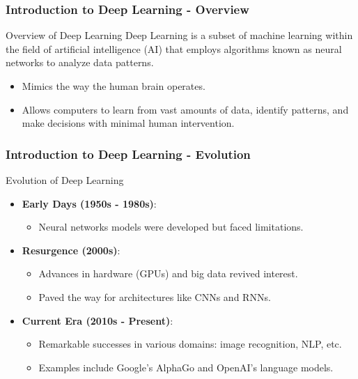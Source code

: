\documentclass[aspectratio=169]{beamer}
\begin{document}
\frame{\titlepage}

\begin{frame}[fragile]
    \frametitle{Introduction to Deep Learning - Overview}
    \begin{block}{Overview of Deep Learning}
        Deep Learning is a subset of machine learning within the field of artificial intelligence (AI) that employs algorithms known as neural networks to analyze data patterns.
    \end{block}
    \begin{itemize}
        \item Mimics the way the human brain operates.
        \item Allows computers to learn from vast amounts of data, identify patterns, and make decisions with minimal human intervention.
    \end{itemize}
\end{frame}

\begin{frame}[fragile]
    \frametitle{Introduction to Deep Learning - Evolution}
    \begin{block}{Evolution of Deep Learning}
        \begin{itemize}
            \item \textbf{Early Days (1950s - 1980s)}: 
                \begin{itemize}
                    \item Neural networks models were developed but faced limitations.
                \end{itemize}
            \item \textbf{Resurgence (2000s)}: 
                \begin{itemize}
                    \item Advances in hardware (GPUs) and big data revived interest.
                    \item Paved the way for architectures like CNNs and RNNs.
                \end{itemize}
            \item \textbf{Current Era (2010s - Present)}: 
                \begin{itemize}
                    \item Remarkable successes in various domains: image recognition, NLP, etc.
                    \item Examples include Google's AlphaGo and OpenAI's language models.
                \end{itemize}
        \end{itemize}
    \end{block}
\end{frame}
\end{document}
